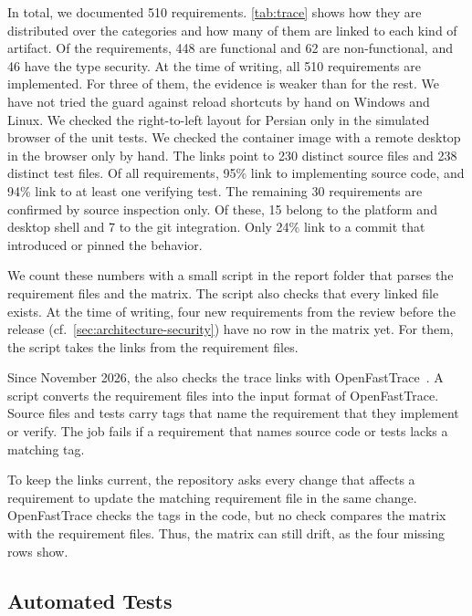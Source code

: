 In total, we documented 510 requirements.
\autoref{tab:trace} shows how they are distributed over the categories and how many of them are linked to each kind of artifact.
Of the requirements, 448 are functional and 62 are non-functional, and 46 have the type security.
At the time of writing, all 510 requirements are implemented.
For three of them, the evidence is weaker than for the rest.
We have not tried the guard against reload shortcuts by hand on Windows and Linux.
We checked the right-to-left layout for Persian only in the simulated browser of the unit tests.
We checked the container image with a remote desktop in the browser only by hand.
The links point to 230 distinct source files and 238 distinct test files.
Of all requirements, 95\% link to implementing source code, and 94\% link to at least one verifying test.
The remaining 30 requirements are confirmed by source inspection only.
Of these, 15 belong to the platform and desktop shell and 7 to the git integration.
Only 24\% link to a commit that introduced or pinned the behavior.

We count these numbers with a small script in the report folder that parses the requirement files and the matrix.
The script also checks that every linked file exists.
At the time of writing, four new requirements from the review before the release (cf.~\autoref{sec:architecture-security}) have no row in the matrix yet.
For them, the script takes the links from the requirement files.

Since November 2026, the \CI also checks the trace links with OpenFastTrace~\cite{openfasttrace}.
A script converts the requirement files into the input format of OpenFastTrace.
Source files and tests carry tags that name the requirement that they implement or verify.
The \CI job fails if a requirement that names source code or tests lacks a matching tag.

To keep the links current, the repository asks every change that affects a requirement to update the matching requirement file in the same change.
OpenFastTrace checks the tags in the code, but no check compares the matrix with the requirement files.
Thus, the matrix can still drift, as the four missing rows show.

\subsection{Automated Tests}\label{sec:requirements-tests}

